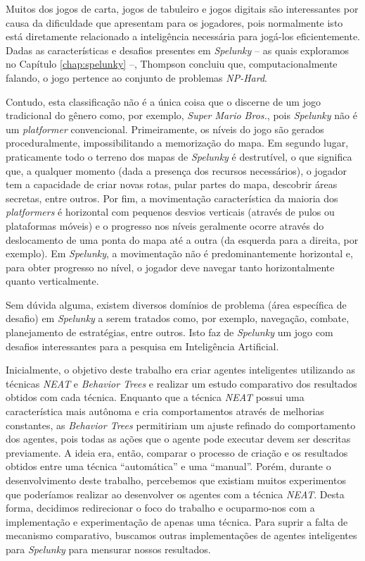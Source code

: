 Muitos dos jogos de carta, jogos de tabuleiro e jogos digitais são interessantes
por causa da dificuldade que apresentam para os jogadores, pois normalmente isto
está diretamente relacionado a inteligência necessária para jogá-los
eficientemente. Dadas as características e desafios
presentes em \textit{Spelunky} -- as quais exploramos no Capítulo
\ref{chap:spelunky} --, Thompson \cite{SPELUNKYHARD} concluiu que,
computacionalmente falando, o jogo pertence ao conjunto de problemas
\textit{NP-Hard}.

Contudo, esta classificação não é a única coisa que o discerne de um jogo
tradicional do gênero como, por exemplo, \textit{Super Mario Bros.}, pois
\textit{Spelunky} não é um \textit{platformer} convencional. Primeiramente, os
níveis do jogo são gerados proceduralmente, impossibilitando a memorização do
mapa. Em segundo lugar, praticamente todo o terreno dos mapas de
\textit{Spelunky} é destrutível, o que significa que, a qualquer momento (dada a
presença dos recursos necessários), o jogador tem a capacidade de criar novas
rotas, pular partes do mapa, descobrir áreas secretas, entre outros. Por fim, a
movimentação característica da maioria dos \textit{platformers} é horizontal com
pequenos desvios verticais (através de pulos ou plataformas móveis) e o
progresso nos níveis geralmente ocorre através do deslocamento de uma ponta do
mapa até a outra (da esquerda para a direita, por exemplo). Em
\textit{Spelunky}, a movimentação não é predominantemente horizontal e, para
obter progresso no nível, o jogador deve navegar tanto horizontalmente quanto
verticalmente.

Sem dúvida alguma, existem diversos domínios de problema (área específica de
desafio) em \textit{Spelunky} a serem tratados como, por exemplo, navegação,
combate, planejamento de estratégias, entre outros. Isto faz de
\textit{Spelunky} um jogo com desafios interessantes para a pesquisa em
Inteligência Artificial.

Inicialmente, o objetivo deste trabalho era criar agentes inteligentes
utilizando as técnicas \textit{NEAT} e \textit{Behavior Trees} e realizar um
estudo comparativo dos resultados obtidos com cada técnica. Enquanto que a
técnica \textit{NEAT} possui uma característica mais autônoma e cria
comportamentos através de melhorias constantes, as \textit{Behavior Trees}
permitiriam um ajuste refinado do comportamento dos agentes, pois todas as ações
que o agente pode executar devem ser descritas previamente. A ideia era, então,
comparar o processo de criação e os resultados obtidos entre uma técnica
``automática'' e uma ``manual''. Porém, durante o desenvolvimento deste
trabalho, percebemos que existiam muitos experimentos que poderíamos realizar ao
desenvolver os agentes com a técnica \textit{NEAT}. Desta forma, decidimos
redirecionar o foco do trabalho e ocuparmo-nos com a implementação e
experimentação de apenas uma técnica. Para suprir a falta de mecanismo
comparativo, buscamos outras implementações de agentes inteligentes para
\textit{Spelunky} para mensurar nossos resultados.

